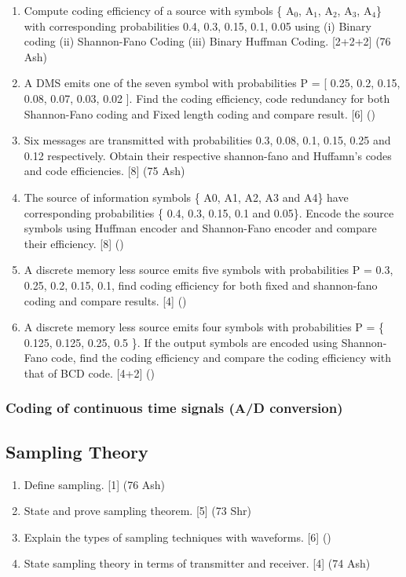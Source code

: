 \documentclass[12pt]{article}
\begin{document}
\begin{enumerate}
        \item Compute coding efficiency of a source with symbols \{ A$_0$, A$_1$, A$_2$, A$_3$, A$_4$\} with corresponding probabilities {0.4, 0.3, 0.15, 0.1, 0.05} using (i) Binary coding (ii) Shannon-Fano Coding (iii) Binary Huffman Coding. \hfill [2+2+2] (76 Ash)

        \item A DMS emits one of the seven symbol with probabilities P = [ 0.25, 0.2, 0.15, 0.08, 0.07, 0.03, 0.02 ]. Find the coding efficiency, code redundancy for both Shannon-Fano coding and Fixed length coding and compare result. \hfill [6] ()
        
        \item Six messages are transmitted with probabilities 0.3, 0.08, 0.1, 0.15, 0.25 and 0.12 respectively. Obtain their respective shannon-fano and Huffamn's codes and code efficiencies. \hfill [8] (75 Ash)
        
        \item The source of information symbols \{ A0, A1, A2, A3 and A4\} have corresponding probabilities \{ 0.4, 0.3, 0.15, 0.1 and 0.05\}. Encode the source symbols using Huffman encoder and Shannon-Fano encoder and compare their efficiency. \hfill [8] ()
        
        \item A discrete memory less source emits five symbols with probabilities P = {0.3, 0.25, 0.2, 0.15, 0.1}, find coding efficiency for both fixed and shannon-fano coding and compare results. \hfill [4] ()
        
        \item A discrete memory less source emits four symbols with probabilities P = \{ 0.125, 0.125, 0.25, 0.5 \}. If the output symbols are encoded using Shannon-Fano code, find the coding efficiency and compare the coding efficiency with that of BCD  code. \hfill [4+2] ()
      \end{enumerate}

    \subsubsection{Coding of continuous time signals (A/D conversion)}
  \subsection{Sampling Theory}
  	\begin{enumerate}
  		\item Define sampling. \hfill [1] (76 Ash)
  		
  		\item State and prove sampling theorem. \hfill [5] (73 Shr)

      \item Explain the types of sampling techniques with waveforms. \hfill [6] ()
      
      \item State sampling theory in terms of transmitter and receiver. \hfill [4] (74 Ash)
  	\end{enumerate}
  
\end{document}
